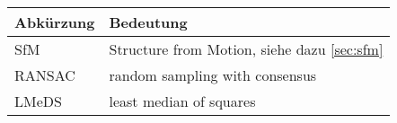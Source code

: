 


\begin{table}[h!]
    \begin{tabularx}{\textwidth}{l X}
        \toprule 
        Abkürzung & Bedeutung \\
        \midrule
        SfM & Structure from Motion, siehe dazu \autoref{sec:sfm} \nameref{sec:sfm}\\
        RANSAC & random sampling with consensus \\
        LMeDS & least median of squares \\
        \bottomrule 
    \end{tabularx}
\end{table}
